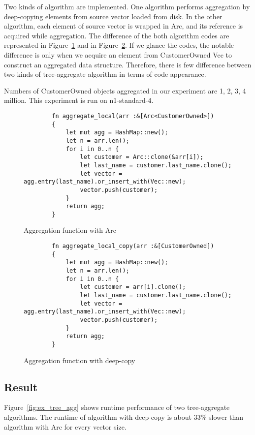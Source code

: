 Two kinds of algorithm are implemented. One algorithm performs aggregation by deep-copying elements from source vector loaded from disk. 
In the other algorithm, each element of source vector is wrapped in Arc, and its reference is acquired while aggregation. 
The difference of the both algorithm codes are represented in Figure~\ref{fig:arc_tree} and in Figure~\ref{fig:deep_tree}.
If we glance the codes, the notable difference is only when we acquire an element from CustomerOwned Vec to construct an aggregated data structure.
Therefore, there is few difference between two kinds of tree-aggregate algorithm in terms of code appearance.

Numbers of CustomerOwned objects aggregated in our experiment are 1, 2, 3, 4 million. 
This experiment is run on n1-standard-4.

\begin{figure}[htb]
    \begin{lstlisting}
        fn aggregate_local(arr :&[Arc<CustomerOwned>]) 
        {   
            let mut agg = HashMap::new();
            let n = arr.len();
            for i in 0..n {
                let customer = Arc::clone(&arr[i]);
                let last_name = customer.last_name.clone();
                let vector = agg.entry(last_name).or_insert_with(Vec::new);
                vector.push(customer);
            }
            return agg;
        }
    \end{lstlisting}
    \caption{Aggregation function with Arc}
    \label{fig:arc_tree}
\end{figure}


\begin{figure}[htb]
    \begin{lstlisting}
        fn aggregate_local_copy(arr :&[CustomerOwned]) 
        {   
            let mut agg = HashMap::new();
            let n = arr.len();
            for i in 0..n {
                let customer = arr[i].clone();
                let last_name = customer.last_name.clone();
                let vector = agg.entry(last_name).or_insert_with(Vec::new);
                vector.push(customer);
            }
            return agg;
        }
    \end{lstlisting}
    \caption{Aggregation function with deep-copy}
    \label{fig:deep_tree}
\end{figure}


\subsection{Result}
Figure~\ref{fig:ex_tree_agg} shows runtime performance of two tree-aggregate algorithms. 
The runtime of algorithm with deep-copy is about 33\% slower than algorithm with Arc for every vector size. 

